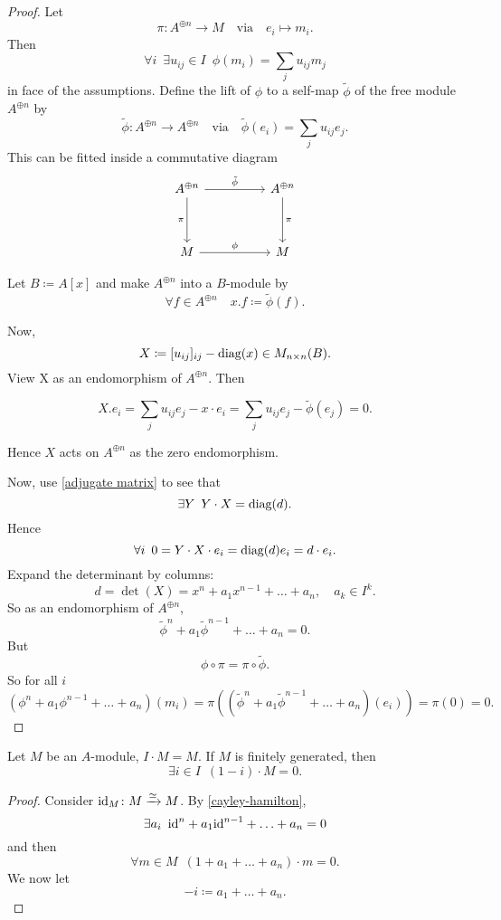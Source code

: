 \begin{proof}
  Let
  \[ \pi \colon A^{\oplus n} \to M \quad \text{via} \quad e_i \mapsto m_i. \]
  Then
  \[ \forall i \enspace \exists u_{ij} \in I \enspace \phi(m_i) = \sum_j u_{ij} m_j\]
  in face of the assumptions.
  Define the lift of $\phi$ to a self-map $\tilde{\phi}$ of the free module $A^{\oplus n}$ by
  \[ \tilde \phi \colon A^{\oplus n} \to A^{\oplus n} \quad \text{via} \quad \tilde \phi(e_i) = \sum_j u_{ij} e_j.\]
  This can be fitted inside a commutative diagram
  \begin{equation*}
    \begin{tikzcd}[row sep=huge, column sep=huge]
      A^{\oplus n} \arrow[swap]{d}{\pi} \arrow{r}{\tilde{\phi}}
      & A^{\oplus n} \arrow{d}{\pi} \\
      M \arrow{r}{\phi}
      & M
    \end{tikzcd}
  \end{equation*}

Let $B \coloneqq A[x]$ and make $A^{\oplus n}$ into a $B$-module by
\[ \forall f \in A^{\oplus n} \quad x . f \coloneqq \tilde{\phi}(f).\]

Now,
\[ X \coloneqq [u_{ij}]_{ij} - \text{diag}(x) \in M_{n \times n} (B).\]
View X as an endomorphism of $A^{\oplus n}$. Then

\[ X . e_i = \sum_j u_{ij} e_j - x \cdot e_i = \sum_j u_{ij} e_j - \tilde{\phi}(e_j) = 0.\]

Hence $X$ acts on $A^{\oplus n}$ as the zero endomorphism.

Now, use \cref{adjugate matrix} to see that
\[ \exists Y \enspace Y \cdot X = \text{diag}(d).\]
Hence
\[ \forall i \enspace 0 = Y \cdot X \cdot e_i = \text{diag}(d) e_i = d \cdot e_i.\]
Expand the determinant by columns:
\[ d = \det(X) = x^n + a_1 x^{n-1} + \dotsc + a_n, \quad a_k \in I^k.\]
So as an endomorphism of $A^{\oplus n}$,
\[\tilde{\phi}^n + a_1 \tilde{\phi}^{n-1} + \dotsc + a_n = 0.\]
But
\[ \phi \circ \pi = \pi \circ \tilde{\phi}.\]
So for all $i$
\[
  (\phi^n + a_1 \phi^{n-1} + \dotsc + a_n)(m_i) = \pi((\tilde{\phi}^n + a_1 \tilde{\phi}^{n-1} + \dotsc + a_n)(e_i)) = \pi (0)= 0.\]
\end{proof}

\begin{lemma}[Nakayama]
  \label{nakayama}
  Let $M$ be an $A$-module, $I \cdot M = M$. If $M$ is finitely generated, then
  \[ \exists i \in I \enspace (1 - i) \cdot M = 0.\]
\end{lemma}
\begin{proof}
  Consider $\text{id}_M \colon M \xrightarrow{\simeq} M$.
  By \cref{cayley-hamilton},
  \[ \exists a_i \enspace \text{id}^n + a_1 \text{id}^{n-1} + \dotsc + a_n = 0\]
  and then
  \[ \forall m \in M \enspace (1 + a_1 + \dotsc + a_n) \cdot m = 0.\]
  We now let
  \[ -i \coloneqq a_1 + \dotsc + a_n.\]
\end{proof}


